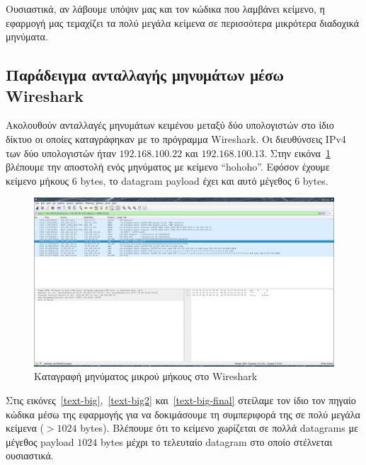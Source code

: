 \documentclass{article}
\begin{document}
Ουσιαστικά, αν λάβουμε υπόψιν μας και τον κώδικα που λαμβάνει κείμενο, η εφαρμογή μας 
τεμαχίζει τα πολύ μεγάλα κείμενα σε περισσότερα μικρότερα διαδοχικά μηνύματα.

\subsection{Παράδειγμα ανταλλαγής μηνυμάτων μέσω Wireshark}
Ακολουθούν ανταλλαγές μηνυμάτων κειμένου μεταξύ δύο υπολογιστών στο ίδιο δίκτυο 
οι οποίες καταγράφηκαν με το πρόγραμμα Wireshark. Οι διευθύνσεις IPv4 των δύο υπολογιστών
ήταν $192.168.100.22$ και $192.168.100.13$. Στην εικόνα~\ref{text-simple-n-small} βλέπουμε 
την αποστολή ενός μηνύματος με κείμενο ``hohoho''. Εφόσον έχουμε κείμενο μήκους $6$ bytes,
το datagram payload έχει και αυτό μέγεθος $6$ bytes.

\begin{figure}
    \centering
    \includegraphics[scale=0.2]{text-simple-small.png}
    \caption{Καταγραφή μηνύματος μικρού μήκους στο Wireshark}\label{text-simple-n-small}
\end{figure}

Στις εικόνες~\ref{text-big},~\ref{text-big2} και~\ref{text-big-final} στείλαμε τον ίδιο 
τον πηγαίο κώδικα μέσω της εφαρμογής για να 
δοκιμάσουμε τη συμπεριφορά της σε πολύ μεγάλα κείμενα ($> 1024$ bytes). Βλέπουμε ότι το 
κείμενο χωρίζεται σε πολλά datagrams με μέγεθος payload $1024$ bytes μέχρι το τελευταίο
datagram στο οποίο στέλνεται ουσιαστικά.
\end{document}
